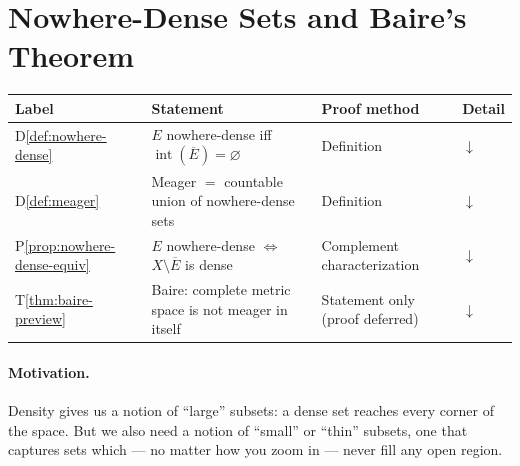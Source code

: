 %

\section{Nowhere-Dense Sets and Baire's Theorem}
\label{sec:nowhere-dense-baire}

\begin{tcolorbox}[colback=gray!6, colframe=gray!40, arc=2pt,
  left=6pt, right=6pt, top=4pt, bottom=4pt,
  title={\small\textbf{Nowhere-Dense Sets and Baire --- Quick Reference}},
  fonttitle=\small\bfseries]
\small
\begin{tabular}{l l l l}
\toprule
\textbf{Label} & \textbf{Statement} & \textbf{Proof method} & \textbf{Detail} \\
\midrule
D\ref{def:nowhere-dense}
  & $E$ nowhere-dense iff $\operatorname{int}(\overline{E}) = \varnothing$
  & Definition
  & \hyperref[def:nowhere-dense]{$\downarrow$} \\[4pt]
D\ref{def:meager}
  & Meager $=$ countable union of nowhere-dense sets
  & Definition
  & \hyperref[def:meager]{$\downarrow$} \\[4pt]
P\ref{prop:nowhere-dense-equiv}
  & $E$ nowhere-dense $\iff$ $X \setminus \overline{E}$ is dense
  & Complement characterization
  & \hyperref[prop:nowhere-dense-equiv]{$\downarrow$} \\[4pt]
T\ref{thm:baire-preview}
  & Baire: complete metric space is not meager in itself
  & Statement only (proof deferred)
  & \hyperref[thm:baire-preview]{$\downarrow$} \\[4pt]
\bottomrule
\end{tabular}
\end{tcolorbox}

\paragraph{Motivation.}
Density gives us a notion of ``large'' subsets: a dense set reaches
every corner of the space.
But we also need a notion of ``small'' or ``thin'' subsets,
one that captures sets which --- no matter how you zoom in ---
never fill any open region.

